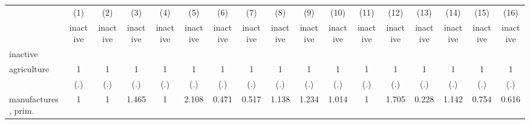 {
\def\sym#1{\ifmmode^{#1}\else\(^{#1}\)\fi}
\begin{tabular}{l*{16}{c}}
\hline\hline
                    &\multicolumn{1}{c}{(1)}&\multicolumn{1}{c}{(2)}&\multicolumn{1}{c}{(3)}&\multicolumn{1}{c}{(4)}&\multicolumn{1}{c}{(5)}&\multicolumn{1}{c}{(6)}&\multicolumn{1}{c}{(7)}&\multicolumn{1}{c}{(8)}&\multicolumn{1}{c}{(9)}&\multicolumn{1}{c}{(10)}&\multicolumn{1}{c}{(11)}&\multicolumn{1}{c}{(12)}&\multicolumn{1}{c}{(13)}&\multicolumn{1}{c}{(14)}&\multicolumn{1}{c}{(15)}&\multicolumn{1}{c}{(16)}\\
                    &\multicolumn{1}{c}{inactive}&\multicolumn{1}{c}{inactive}&\multicolumn{1}{c}{inactive}&\multicolumn{1}{c}{inactive}&\multicolumn{1}{c}{inactive}&\multicolumn{1}{c}{inactive}&\multicolumn{1}{c}{inactive}&\multicolumn{1}{c}{inactive}&\multicolumn{1}{c}{inactive}&\multicolumn{1}{c}{inactive}&\multicolumn{1}{c}{inactive}&\multicolumn{1}{c}{inactive}&\multicolumn{1}{c}{inactive}&\multicolumn{1}{c}{inactive}&\multicolumn{1}{c}{inactive}&\multicolumn{1}{c}{inactive}\\
\hline
inactive            &                     &                     &                     &                     &                     &                     &                     &                     &                     &                     &                     &                     &                     &                     &                     &                     \\
agriculture         &           1         &           1         &           1         &           1         &           1         &           1         &           1         &           1         &           1         &           1         &           1         &           1         &           1         &           1         &           1         &           1         \\
                    &         (.)         &         (.)         &         (.)         &         (.)         &         (.)         &         (.)         &         (.)         &         (.)         &         (.)         &         (.)         &         (.)         &         (.)         &         (.)         &         (.)         &         (.)         &         (.)         \\
[1em]
manufactures, prim. &           1         &           1         &       1.465         &           1         &       2.108         &       0.471         &       0.517         &       1.138         &       1.234         &       1.014         &           1         &       1.705         &       0.228         &       1.142         &       0.754         &       0.616         \\

\end{tabular}}
